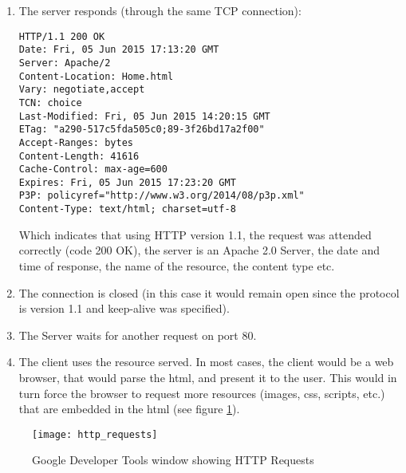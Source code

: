 \begin{enumerate}
This simple text message is asking the server to GET (HTTP Method) the path ``/'' (the root path) with version 1.1 of
the HTTP Protocol. The rest of the text is not required (HTTP 1.1 does require the Host Header to be present), but
adds additional information to the request. The Connection ``keep-alive'' header is added to use one TCP connection
for all requests and responses, instead of opening and closing a connection on each request, to reduce overhead (this
is standard in HTTP 1.1). The Accept Header tells the server what type of content it expects (in this case it prefers
html, xhtml or xml, or with less preference represented by the q value from 0 to 1, an image, or with even less
preference, anything else). The user agent tells the server which platform is making the request, and so on.
\item The server responds (through the same TCP connection):
\begin{verbatim}
HTTP/1.1 200 OK
Date: Fri, 05 Jun 2015 17:13:20 GMT
Server: Apache/2
Content-Location: Home.html
Vary: negotiate,accept
TCN: choice
Last-Modified: Fri, 05 Jun 2015 14:20:15 GMT
ETag: "a290-517c5fda505c0;89-3f26bd17a2f00"
Accept-Ranges: bytes
Content-Length: 41616
Cache-Control: max-age=600
Expires: Fri, 05 Jun 2015 17:23:20 GMT
P3P: policyref="http://www.w3.org/2014/08/p3p.xml"
Content-Type: text/html; charset=utf-8
\end{verbatim}
Which indicates that using HTTP version 1.1, the request was attended correctly (code 200 OK), the server is an Apache
2.0 Server, the date and time of response, the name of the resource, the content type etc.
\item The connection is closed (in this case it would remain open since the protocol is version 1.1 and keep-alive was
specified).
\item The Server waits for another request on port 80.
\item The client uses the resource served. In most cases, the client would be a web browser, that would parse the
html, and present it to the user. This would in turn force the browser to request more resources (images, css,
scripts, etc.) that are embedded in the html (see figure \ref{http_requests}).
\end{enumerate}
\begin{figure}[h]
	\texttt{[image: http\_requests]}
	\caption{Google Developer Tools window showing HTTP Requests\label{http_requests}}	
\end{figure}

